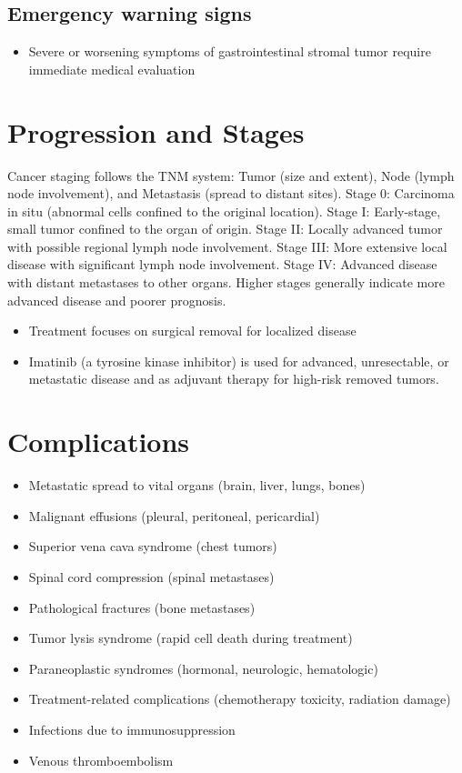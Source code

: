 \subsection{Emergency warning signs}
\begin{itemize}[noitemsep]
  \item Severe or worsening symptoms of gastrointestinal stromal tumor require immediate medical evaluation
\end{itemize}
\section{Progression and Stages}
Cancer staging follows the TNM system: Tumor (size and extent), Node (lymph node involvement), and Metastasis (spread to distant sites). Stage 0: Carcinoma in situ (abnormal cells confined to the original location). Stage I: Early-stage, small tumor confined to the organ of origin. Stage II: Locally advanced tumor with possible regional lymph node involvement. Stage III: More extensive local disease with significant lymph node involvement. Stage IV: Advanced disease with distant metastases to other organs. Higher stages generally indicate more advanced disease and poorer prognosis.

\begin{itemize}[noitemsep]
  \item Treatment focuses on surgical removal for localized disease
  \item Imatinib (a tyrosine kinase inhibitor) is used for advanced, unresectable, or metastatic disease and as adjuvant therapy for high-risk removed tumors.
\end{itemize}
\section{Complications}
\begin{itemize}[noitemsep]
  \item Metastatic spread to vital organs (brain, liver, lungs, bones)
  \item Malignant effusions (pleural, peritoneal, pericardial)
  \item Superior vena cava syndrome (chest tumors)
  \item Spinal cord compression (spinal metastases)
  \item Pathological fractures (bone metastases)
  \item Tumor lysis syndrome (rapid cell death during treatment)
  \item Paraneoplastic syndromes (hormonal, neurologic, hematologic)
  \item Treatment-related complications (chemotherapy toxicity, radiation damage)
  \item Infections due to immunosuppression
  \item Venous thromboembolism
\end{itemize}

